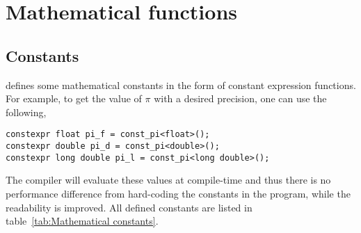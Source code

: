%
%
%
%

\chapter{Mathematical functions}
\label{chap:Mathemtical functions}

\section{Constants}
\label{sec:Constants}

\mckl defines some mathematical constants in the form of constant expression
functions. For example, to get the value of $\pi$ with a desired precision, one
can use the following,
\begin{verbatim}
constexpr float pi_f = const_pi<float>();
constexpr double pi_d = const_pi<double>();
constexpr long double pi_l = const_pi<long double>();
\end{verbatim}
The compiler will evaluate these values at compile-time and thus there is no
performance difference from hard-coding the constants in the program, while the
readability is improved. All defined constants are listed in
table~\ref{tab:Mathematical constants}.

